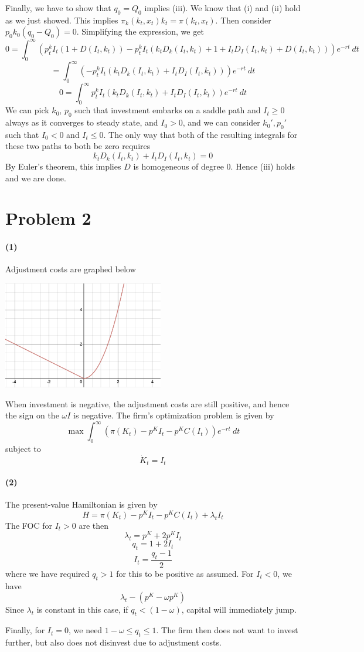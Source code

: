 \documentclass[10pt,letter]{article}
\newcommand{\problem}[1]{\section*{Problem #1}}
\newcommand{\problempart}[1]{\paragraph{#1}}
\begin{document}
Finally, we have to show that $q_0 = Q_0$ implies (iii). We know that (i) and (ii) hold as we just showed. This implies $\pi_k(k_t, x_t) k_t = \pi(k_t, x_t)$. Then consider $p_0 k_0(q_0 - Q_0) = 0$. Simplifying the expression, we get
\[ 0 = \int_0^\infty \left( p^k_t I_t (1 + D(I_t, k_t)) - p^k_t I_t (k_t D_k(I_t, k_t) + 1 + I_tD_I(I_t, k_t) + D(I_t, k_t)) \right) e^{-rt} \ dt \]
\[  = \int_0^\infty \left(  - p^k_t I_t (k_t D_k(I_t, k_t) + I_tD_I(I_t, k_t)) \right) e^{-rt} \ dt \]
\[ 0 =  \int_0^\infty p^k_t I_t (k_t D_k(I_t, k_t) + I_tD_I(I_t, k_t))  e^{-rt} \ dt \]
We can pick $k_0$, $p_0$ such that investment embarks on a saddle path and $I_t \ge 0$ always as it converges to steady state, and $I_0 > 0$, and we can consider $k_0', p_0'$ such that $I_0 < 0$ and $ I_t \le 0$. The only way that both of the resulting integrals for these two paths to both be zero requires
\[ k_t D_k(I_t, k_t) + I_tD_I(I_t, k_t) = 0 \]
By Euler's theorem, this implies $D$ is homogeneous of degree 0. Hence (iii) holds and we are done.
\problem{2}
\problempart{(1)}
Adjustment costs are graphed below

\includegraphics[width=7cm]{ps2fig1}

When investment is negative, the adjustment costs are still positive, and hence the sign on the $\omega I$ is negative. The firm's optimization problem is given by
\[ \max \int_0^\infty \left( \pi(K_t) - p^K I_t - p^K C(I_t) \right) e^{-rt} \ dt \]
subject to
\[ \dot{K}_t = I_t \]
\problempart{(2)}
The present-value Hamiltonian is given by
\[ H = \pi(K_t) - p^K I_t - p^K C(I_t) + \lambda_t I_t \]
The FOC for $I_t > 0$ are then
\[ \lambda_t = p^K + 2p^K I_t \]
\[ q_t = 1 + 2I_t \]
\[ I_t = \frac{q_t - 1}{2} \]
where we have required $q_t > 1$ for this to be positive as assumed. For $I_t < 0$, we have
\[ \lambda_t - (p^K - \omega p^K) \]
Since $\lambda_t$ is constant in this case, if $q_t < (1-\omega)$, capital will immediately jump.

Finally, for $I_t = 0$, we need $1-\omega \le q_t \le 1$. The firm then does not want to invest further, but also does not disinvest due to adjustment costs.
\end{document}
